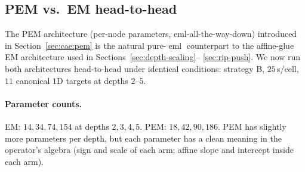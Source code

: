 \documentclass[11pt]{article}
\newcommand{\eml}{\operatorname{eml}}
\begin{document}
\subsection{PEM vs.\ EM head-to-head}
\label{sec:pem}

The PEM architecture (per-node parameters, eml-all-the-way-down) introduced
in Section~\ref{sec:cae:pem} is the natural pure-$\eml$ counterpart to the
affine-glue EM architecture used in Sections~\ref{sec:depth-scaling}--%
\ref{sec:rip-push}. We now run both architectures head-to-head under
identical conditions: strategy B, $25\,$s/cell, $11$ canonical $1$D
targets at depths $2$--$5$.

\paragraph{Parameter counts.}
EM: $14, 34, 74, 154$ at depths $2, 3, 4, 5$. PEM: $18, 42, 90, 186$. PEM
has slightly more parameters per depth, but each parameter has a clean
meaning in the operator's algebra (sign and scale of each arm; affine
slope and
intercept inside each arm).
\end{document}
